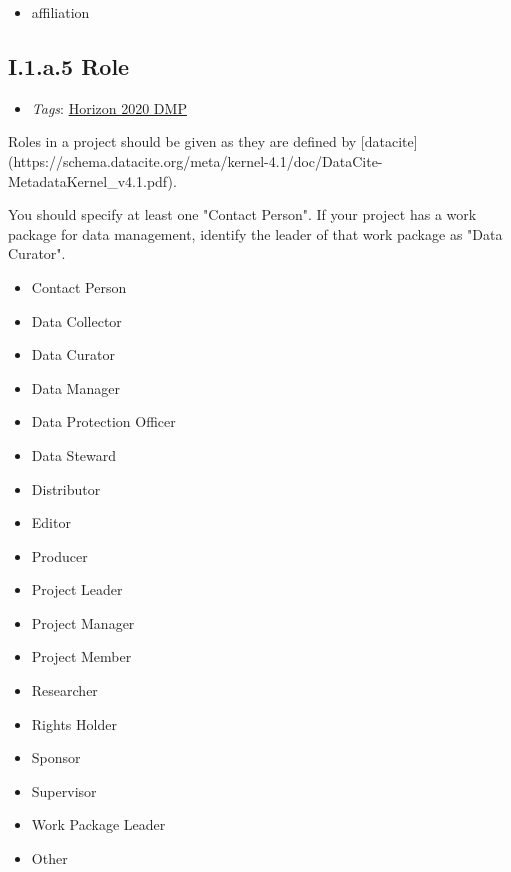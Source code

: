 \documentclass[a4paper,12pt]{report}
\begin{document}
\begin{itemize}
  \item[\CheckmarkBold]
  \begin{markdown}
  affiliation
  \end{markdown}
  
\end{itemize}


\subsection*{\protect\textcolor{colorSecId}{I.1.a.5} Role}

\label{1e85da40-bbfc-4180-903e-6c569ed2da38.73d686bd-7939-412e-8631-502ee6d9ea7b.e353afd1-f1ef-42df-a9f8-4eaac8800486.829dcda6-db8a-40ac-819a-92b9b52490f5}


\begin{itemize}
  \item \textit{Tags}: \ul{Horizon 2020 DMP}
  \end{itemize}


\noindent
\begin{markdown}
Roles in a project should be given as they are defined by [datacite](https://schema.datacite.org/meta/kernel-4.1/doc/DataCite-MetadataKernel_v4.1.pdf). 

You should specify at least one "Contact Person". If your project has a work package for data management, identify the leader of that work package as "Data Curator".
\end{markdown}


\begin{itemize}
  \item[\CheckmarkBold] Contact Person
  \item[\CheckmarkBold] Data Collector
  \item[\CheckmarkBold] Data Curator
  \item[\XSolidBrush] Data Manager
  \item[\XSolidBrush] Data Protection Officer
  \item[\CheckmarkBold] Data Steward
  \item[\CheckmarkBold] Distributor
  \item[\XSolidBrush] Editor
  \item[\CheckmarkBold] Producer
  \item[\XSolidBrush] Project Leader
  \item[\XSolidBrush] Project Manager
  \item[\XSolidBrush] Project Member
  \item[\XSolidBrush] Researcher
  \item[\CheckmarkBold] Rights Holder
  \item[\XSolidBrush] Sponsor
  \item[\XSolidBrush] Supervisor
  \item[\XSolidBrush] Work Package Leader
  \item[\CheckmarkBold] Other
\end{itemize}
\end{document}
